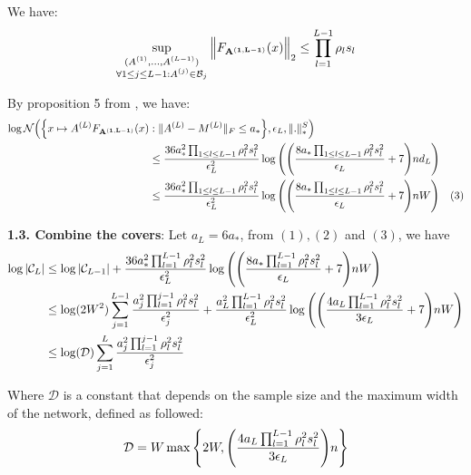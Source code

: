 \noindent We have:
\begin{align*}
    \sup_{\substack{
        (A^{(1)}, \dots, A^{(L-1)}) \\
        \forall 1 \le j \le L-1 : A^{(j)}\in\mathcal{B}_j
    }} \Big\|
        F_{\bf A^{(1, L-1)}}(x)
    \Big\|_2 \le \prod_{l=1}^{L-1} \rho_ls_l
\end{align*}

\noindent By proposition 5 from \cite{article:ledent_and_mustafa}, we have:
\begin{align*}
    \log\mathcal{N}\Big( 
        \Big\{ 
            x\mapsto A^{(L)}F_{\bf A^{(1, L-1)}}(x) &: \|A^{(L)} - M^{(L)}\|_F \le a_*
         \Big\}, \epsilon_L, \|.\|_*^S
     \Big) \\
    &\le \frac{36a_*^2\prod_{1\le l \le L-1}\rho_l^2s_l^2}{\epsilon_L^2}\log\Bigg( 
        \Bigg( 
            \frac{8a_*\prod_{1\le l \le L-1}\rho_l^2s_l^2}{\epsilon_L} + 7
         \Bigg)nd_L
     \Bigg) \\
    &\le \frac{36a_*^2\prod_{1\le l \le L-1}\rho_l^2s_l^2}{\epsilon_L^2}\log\Bigg( 
        \Bigg( 
            \frac{8a_*\prod_{1\le l \le L-1}\rho_l^2s_l^2}{\epsilon_L} + 7
         \Bigg)nW
     \Bigg) \ \ \ (3)
\end{align*}

\noindent\newline\textbf{1.3. Combine the covers}: Let $a_L = 6a_*$, from $(1), (2)$ and $(3)$, we have
\begin{align*}
    \log|\mathcal{C}_L| 
    &\le \log|\mathcal{C}_{L-1}| + \frac{36a_*^2\prod_{l=1}^{L-1}\rho_l^2s_l^2}{\epsilon_L^2}\log\Bigg( 
        \Bigg( 
            \frac{8a_*\prod_{l=1}^{L-1}\rho_l^2s_l^2}{\epsilon_L} + 7
         \Bigg)nW
     \Bigg)
    \\
    &\le \log(2W^2)\sum_{j=1}^{L-1}\frac{a_j^2\prod_{l=1}^{j-1}\rho_l^2s_l^2}{\epsilon_j^2} + \frac{a_L^2\prod_{l=1}^{L-1}\rho_l^2s_l^2}{\epsilon_L^2}\log\Bigg( 
        \Bigg( 
            \frac{4a_L\prod_{l=1}^{L-1}\rho_l^2s_l^2}{3\epsilon_L} + 7
         \Bigg)nW
     \Bigg) \\
    &\le \log(\mathcal{D}) \sum_{j=1}^L \frac{a_j^2\prod_{l=1}^{j-1}\rho_l^2s_l^2}{\epsilon_j^2}
\end{align*}

\noindent Where $\mathcal{D}$ is a constant that depends on the sample size and the maximum width of the network, defined as followed:
\begin{align*}
    \mathcal{D} = W\max\Bigg\{ 
        2W, \Bigg( 
            \frac{4a_L\prod_{l=1}^{L-1}\rho_l^2s_l^2}{3\epsilon_L}
         \Bigg)n
     \Bigg\}
\end{align*}


